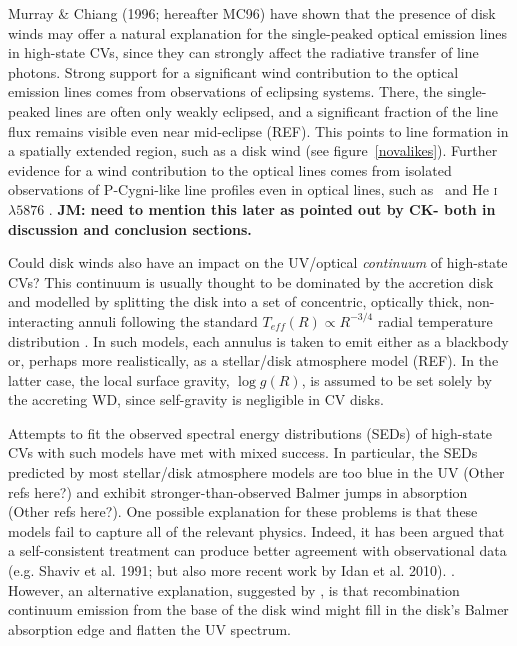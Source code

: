 \documentclass[preprint, a4paper, 11pt]{aastex}
\begin{document}
Murray \& Chiang (1996; hereafter MC96)\nocite{MC96} 
have shown that the presence of disk winds may
offer a natural explanation for the single-peaked optical emission lines in
high-state CVs, since they can strongly affect the radiative transfer
of line photons. Strong support for a significant wind contribution to the
optical emission lines comes from observations of eclipsing
systems. There, the single-peaked lines are often only weakly
eclipsed, and a significant fraction of the line flux remains visible
even near mid-eclipse (REF). This points to line formation in a spatially
extended region, such as a disk wind (see figure~\ref{novalikes}).
Further evidence for a wind contribution to the optical lines comes
from isolated observations of P-Cygni-like line profiles even in optical
lines, such as \ha\ and He \textsc{i} $\lambda5876$ \citep{RN98, kafka2004}.
{\bf JM: need to mention this later as pointed out by CK- both in discussion
and conclusion sections.}

Could disk winds also have an impact on the UV/optical {\em continuum}
of high-state CVs? This continuum is usually thought to be dominated
by the accretion disk and modelled by splitting the disk into
a set of concentric, optically thick, non-interacting annuli following
the standard $T_{eff}(R) \propto R^{-3/4}$ radial temperature
distribution \citep{shakurasunyaev1973}. In such
models, each annulus is taken to emit either as a blackbody or,
perhaps more realistically, as a stellar/disk atmosphere model
(REF). 
In the latter case, the local surface gravity, $\log{g}(R)$, is
assumed to be set solely by the accreting WD, since self-gravity is
negligible in CV disks.


Attempts to fit the observed spectral energy distributions (SEDs) of
high-state CVs with such models have met with mixed success. In
particular, the SEDs predicted by most stellar/disk atmosphere models 
are too blue in the UV \citep{wade1988,long1991,long1994}(Other refs here?) and exhibit
stronger-than-observed Balmer jumps in absorption \cite{wade1984,haug1987,ladous1989b,knigge1998}(Other refs here?). One possible
explanation for these problems is that these models fail to capture
all of the relevant physics. Indeed, it has been argued that a
self-consistent treatment can 
produce better agreement with observational data (e.g. Shaviv et
al. 1991;  but also more recent work by Idan et al. 2010). 
\nocite{idanshaviv2010} \nocite{shaviv1991}. However, an alternative 
explanation, suggested by \cite{KLWB98}, is that recombination continuum
emission from the base of the disk wind might fill in the disk's
Balmer absorption edge and flatten the UV spectrum. 
\end{document}
